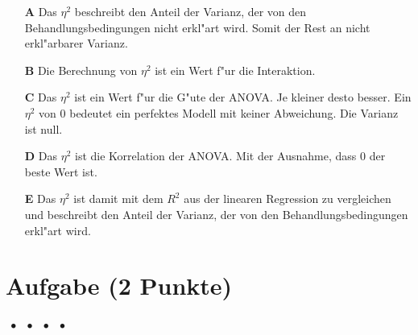 \documentclass[a4paper, 9pt]{scrartcl}\usepackage[]{graphicx}\usepackage[]{xcolor}
\begin{document}
\begin{enumerate}
\item [\textbf{A} \msquare] Das $\eta^2$ beschreibt den Anteil der Varianz, der von den Behandlungsbedingungen nicht erkl{"a}rt wird. Somit der Rest an nicht erkl{"a}rbarer Varianz.
\item [\textbf{B} \msquare] Die Berechnung von $\eta^2$ ist ein Wert f{"u}r die Interaktion.
\item [\textbf{C} \msquare] Das $\eta^2$ ist ein Wert f{"u}r die G{"u}te der ANOVA. Je kleiner desto besser. Ein $\eta^2$ von 0 bedeutet ein perfektes Modell mit keiner Abweichung. Die Varianz ist null.
\item [\textbf{D} \msquare] Das $\eta^2$ ist die Korrelation der ANOVA. Mit der Ausnahme, dass 0 der beste Wert ist.
\item [\textbf{E} \msquare] Das $\eta^2$ ist damit mit dem $R^2$ aus der linearen Regression zu vergleichen und beschreibt den Anteil der Varianz, der von den Behandlungsbedingungen erkl{"a}rt wird.
\end{enumerate}

\section{Aufgabe \hfill (2 Punkte)}

\ifcollection
\begin{flushright}
\tiny\vspace{-2Ex}
\textbf{\examinhaltstart}
\exammodulemathstat $\;\bullet$
\exammodulestat $\;\bullet$
\exammodulestatbbv $\;\bullet$
\exammodulestatversuch $\;\bullet$
\exammodulebiostat
\vspace{-1Ex}
\end{flushright}
\fi
\end{document}
